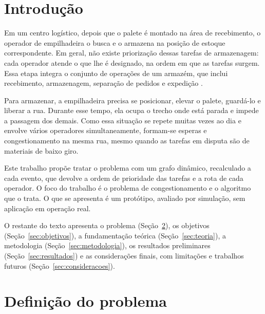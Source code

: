 \documentclass[
	article,
	11pt,
	oneside,
	a4paper,
	english,
	brazil,
	sumario=tradicional
	]{abntex2}
\begin{document}
\textual

\setlength{\JustifyingParindent}{1.3cm}
\justifying

\section{Introdução}

Em um centro logístico, depois que o palete é montado na área de recebimento,
o operador de empilhadeira o busca e o armazena na posição de estoque
correspondente. Em geral, não existe priorização dessas tarefas de armazenagem:
cada operador atende o que lhe é designado, na ordem em que as tarefas surgem.
Essa etapa integra o conjunto de operações de um armazém, que inclui
recebimento, armazenagem, separação de pedidos e expedição
\cite{gu2007}.

Para armazenar, a empilhadeira precisa se posicionar, elevar o palete, guardá-lo
e liberar a rua. Durante esse tempo, ela ocupa o trecho onde está parada e
impede a passagem dos demais. Como essa situação se repete muitas vezes ao dia
e envolve vários operadores simultaneamente, formam-se esperas e
congestionamento na mesma rua, mesmo quando as tarefas em disputa são de
materiais de baixo giro.

Este trabalho propõe tratar o problema com um grafo dinâmico, recalculado a cada
evento, que devolve a ordem de prioridade das tarefas e a rota de cada
operador. O foco do trabalho é o problema de congestionamento e o algoritmo
que o trata. O que se apresenta é um protótipo, avaliado por simulação, sem
aplicação em operação real.

O restante do texto apresenta o problema (Seção~\ref{sec:problema}), os
objetivos (Seção~\ref{sec:objetivos}), a fundamentação teórica
(Seção~\ref{sec:teoria}), a metodologia (Seção~\ref{sec:metodologia}), os
resultados preliminares (Seção~\ref{sec:resultados}) e as considerações finais,
com limitações e trabalhos futuros (Seção~\ref{sec:consideracoes}).

\section{Definição do problema}
\label{sec:problema}
\end{document}
